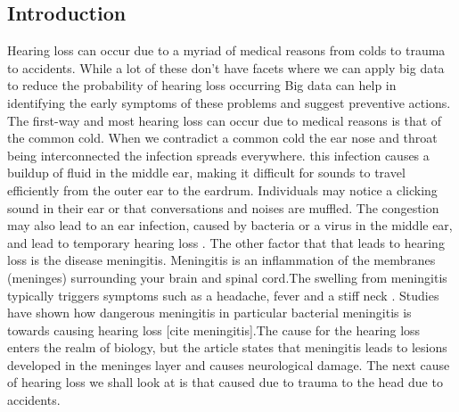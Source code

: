 \documentclass[sigconf]{acmart}
\begin{document}
\subsection{Introduction}
Hearing loss can occur due to a myriad of medical reasons from colds to trauma to accidents. While a lot of these don't have facets where we can apply big data to reduce the probability of hearing loss occurring Big data can help in identifying the early symptoms of these problems and suggest preventive actions. The first-way and most hearing loss can occur due to medical reasons is that of the common cold. When we contradict a common cold the ear nose and throat being interconnected the infection spreads everywhere. this infection causes a buildup of fluid in the middle ear, making it difficult for sounds to travel efficiently from the outer ear to the eardrum. Individuals may notice a clicking sound in their ear or that conversations and noises are muffled. The congestion may also lead to an ear infection, caused by bacteria or a virus in the middle ear, and lead to temporary hearing loss \cite{Wikipedia2017}. The other factor that that leads to hearing loss is the disease meningitis. Meningitis is an inflammation of the membranes (meninges) surrounding your brain and spinal cord.The swelling from meningitis typically triggers symptoms such as a headache, fever and a stiff neck \cite{mayoclinic2017}. Studies have shown how dangerous meningitis in particular bacterial meningitis is towards causing hearing loss [cite meningitis].The cause for the hearing loss enters the realm of biology, but the article \cite{Richardson1997} states that meningitis leads to lesions developed in the meninges layer and causes neurological damage. The next cause of hearing loss we shall look at is that caused due to trauma to the head due to accidents.
\end{document}
